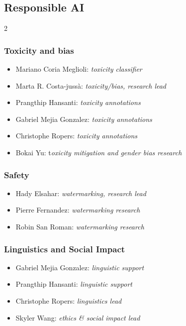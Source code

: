 \subsection*{Responsible AI}
\begin{multicols}{2}

\subsubsection*{Toxicity and bias}
\begin{itemize}[itemsep=0.00cm,parsep=0.0cm,left=0pt, label={}]
\item Mariano Coria Meglioli: \textit{toxicity classifier}
\item Marta R. Costa-jussà: \textit{toxicity/bias, research lead}
\item Prangthip Hansanti: \textit{toxicity annotations}
\item Gabriel Mejia Gonzalez: \textit{toxicity annotations}
\item Christophe Ropers: \textit{toxicity annotations}
\item Bokai Yu: t\textit{oxicity mitigation and gender bias research}
\end{itemize}

\subsubsection*{Safety}
\begin{itemize}[itemsep=0.00cm,parsep=0.0cm,left=0pt, label={}]
\item Hady Elsahar: \textit{watermarking, research lead}
\item Pierre Fernandez: \textit{watermarking research}
\item Robin San Roman: \textit{watermarking research}
\end{itemize}
\subsubsection*{Linguistics and Social Impact}
\begin{itemize}[itemsep=0.00cm,parsep=0.0cm,left=0pt, label={}]
\item Gabriel Mejia Gonzalez:  \textit{linguistic support}
\item Prangthip Hansanti: \textit{linguistic support} 
\item Christophe Ropers: \textit{linguistics lead}
\item Skyler Wang: \textit{ethics \& social impact lead}
\end{itemize}


\end{multicols}

